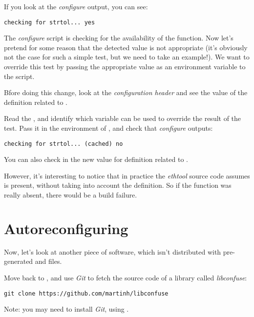 If you look at the {\em configure} output, you can see:

\begin{verbatim}
checking for strtol... yes
\end{verbatim}

The {\em configure} script is checking for the availability of the
 function. Now let's pretend for some reason that the
detected value is not appropriate (it's obviously not the case for
such a simple test, but we need to take an example!). We want to
override this test by passing the appropriate value as an environment
variable to the  script.

Bfore doing this change, look at the
 {\em configuration header} and see the value of the
definition related to .

Read the , and identify which variable can be used to
override the result of the  test. Pass it in the
environment of , and check that {\em configure}
outputs:

\begin{verbatim}
checking for strtol... (cached) no
\end{verbatim}

You can also check in  the new value for definition
related to .

However, it's interesting to notice that in practice the {\em ethtool}
source code assumes  is present, without taking into
account the  definition. So if the function was
really absent, there would be a build failure.

\section{Autoreconfiguring}

Now, let's look at another piece of software, which isn't distributed
with pre-generated  and  files.

Move back to , and use {\em Git} to
fetch the source code of a library called {\em libconfuse}:

\begin{verbatim}
git clone https://github.com/martinh/libconfuse
\end{verbatim}

Note: you may need to install {\em Git}, using .

